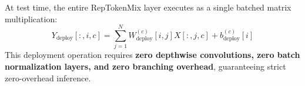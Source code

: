 At test time, the entire RepTokenMix layer executes as a single batched matrix multiplication:
\begin{equation}
    Y_{\text{deploy}}[:, i, c] = \sum_{j=1}^N W_{\text{deploy}}^{(c)}[i, j] X[:, j, c] + b_{\text{deploy}}^{(c)}[i]
\end{equation}
This deployment operation requires \textbf{zero depthwise convolutions, zero batch normalization layers, and zero branching overhead}, guaranteeing strict zero-overhead inference.
